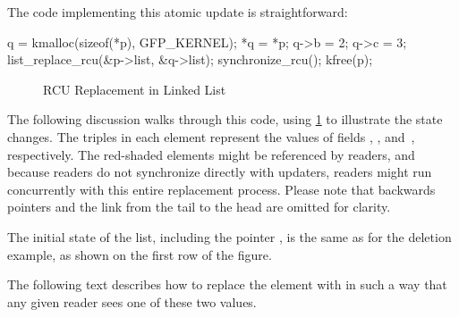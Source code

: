 The code implementing this atomic update is straightforward:

\begin{fcvlabel}
\begin{VerbatimN}[samepage=true,commandchars=\\\[\],firstnumber=15]
q = kmalloc(sizeof(*p), GFP_KERNEL);	\lnlbl[kmalloc]
*q = *p;				\lnlbl[copy]
q->b = 2;				\lnlbl[update1]
q->c = 3;				\lnlbl[update2]
list_replace_rcu(&p->list, &q->list);	\lnlbl[replace]
synchronize_rcu();			
kfree(p);				\lnlbl[kfree]
\end{VerbatimN}
\end{fcvlabel}

\begin{figure}
\centering
{}
\caption{RCU Replacement in Linked List}
\label{fig:defer:RCU Replacement in Linked List}
\end{figure}

The following discussion walks through this code, using
\cref{fig:defer:RCU Replacement in Linked List} to illustrate
the state changes.
The triples in each element represent the values of fields ,
, and~, respectively.
The red-shaded elements might be referenced by readers,
and because readers do not synchronize directly with updaters,
readers might run concurrently with this entire replacement process.
Please note that backwards pointers and the link from the tail to the
head are omitted for clarity.

The initial state of the list, including the pointer ,
is the same as for the deletion example, as shown on the
first row of the figure.

The following text describes how to replace the  element
with  in such a way that any given reader sees one of these
two values.

